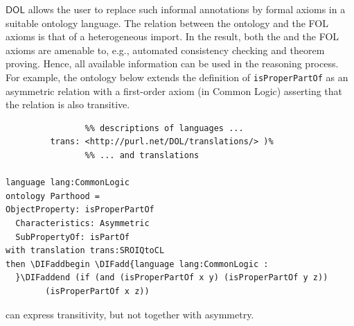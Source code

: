 \documentclass[10pt,fleqn,final]{scrreprt}
\newcommand*{\DOL}{\ensuremath{\mathsf{DOL}}\xspace}
\newenvironment{definitions}[0]{\medskip }{}
\providecommand{\DIFadd}[1]{{\protect\color{blue}\uwave{#1}}} %
\providecommand{\DIFaddbegin}{} %
\providecommand{\DIFaddend}{} %
\providecommand{\DIFdelbegin}{} %
\providecommand{\DIFdelend}{} %
\begin{document}
\begin{definitions}
\DOL allows the user to replace such informal annotations by formal axioms in a suitable ontology 
language. The relation between the \OWL ontology and the FOL axioms is that of a heterogeneous 
import. In the result, both the \OWL and the FOL axioms are amenable to, e.g., automated consistency 
checking and theorem proving. Hence, all available information can be used in the reasoning process.
For example, the ontology below extends the \OWL definition of \texttt{isProperPartOf} as an asymmetric relation
with a first-order axiom (in Common Logic) asserting that the relation is also transitive.
\DIFdelbegin %
\DIFdelend \DIFaddbegin \begin{lstlisting}[basicstyle=\small\ttfamily,language=dolText,alsolanguage=clif,alsolanguage=owl2Manchester,escapechar=@,mathescape]
\DIFaddend %prefix( lang:  <http://purl.net/DOL/languages/>
                %% descriptions of languages ...
         trans: <http://purl.net/DOL/translations/> )%
                %% ... and translations

language lang:CommonLogic
ontology Parthood =
ObjectProperty: isProperPartOf  
  Characteristics: Asymmetric  
  SubPropertyOf: isPartOf 
with translation trans:SROIQtoCL
then \DIFaddbegin \DIFadd{language lang:CommonLogic :
  }\DIFaddend (if (and (isProperPartOf x y) (isProperPartOf y z)) 
        (isProperPartOf x z))
\end{lstlisting}
\OWL can express transitivity, but not together with asymmetry.


\end{definitions}
\end{document}
